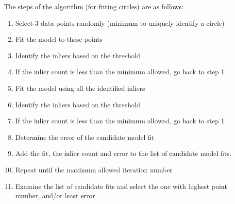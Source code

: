 The steps of the algorithm (for fitting circles) are as follows:
\begin{enumerate}
    \item Select 3 data points randomly (minimum to uniquely identify a circle)
    \item Fit the model to these points
    \item Identify the inliers based on the threshold
    \item If the inlier count is less than the minimum allowed, go back to step 1
    \item Fit the model using all the identified inliers
    \item Identify the inliers based on the threshold
    \item If the inlier count is less than the minimum allowed, go back to step 1
    \item Determine the error of the candidate model fit
    \item Add the fit, the inlier count and error to the list of candidate model fits.
    \item Repeat until the maximum allowed iteration number
    \item Examine the list of candidate fits and select the one with highest point number, and/or least error
\end{enumerate}

